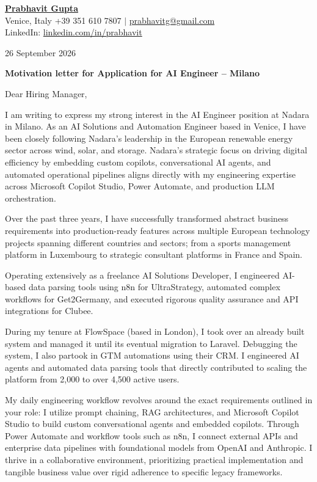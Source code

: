 \documentclass[a4paper,10pt]{article}
\begin{document}
\textbf{\underline{\large Prabhavit Gupta}}\\[2pt]
{\small Venice, Italy \quad +39 351 610 7807 \quad $\vert$ \quad \href{mailto:prabhavitg@gmail.com}{prabhavitg@gmail.com}\\[1pt]
LinkedIn: \href{https://www.linkedin.com/in/prabhavit/}{linkedin.com/in/prabhavit}}

\vspace{6pt}
26 September 2026

\vspace{4pt}
\textbf{\large Motivation letter for Application for AI Engineer -- Milano}

\vspace{4pt}
Dear Hiring Manager,

I am writing to express my strong interest in the AI Engineer position at Nadara in Milano. As an AI Solutions and Automation Engineer based in Venice, I have been closely following Nadara's leadership in the European renewable energy sector across wind, solar, and storage. Nadara's strategic focus on driving digital efficiency by embedding custom copilots, conversational AI agents, and automated operational pipelines aligns directly with my engineering expertise across Microsoft Copilot Studio, Power Automate, and production LLM orchestration.

Over the past three years, I have successfully transformed abstract business requirements into production-ready features across multiple European technology projects spanning different countries and sectors; from a sports management platform in Luxembourg to strategic consultant platforms in France and Spain.

Operating extensively as a freelance AI Solutions Developer, I engineered AI-based data parsing tools using n8n for UltraStrategy, automated complex workflows for Get2Germany, and executed rigorous quality assurance and API integrations for Clubee.

During my tenure at FlowSpace (based in London), I took over an already built system and managed it until its eventual migration to Laravel. Debugging the system, I also partook in GTM automations using their CRM. I engineered AI agents and automated data parsing tools that directly contributed to scaling the platform from 2,000 to over 4,500 active users.

My daily engineering workflow revolves around the exact requirements outlined in your role: I utilize prompt chaining, RAG architectures, and Microsoft Copilot Studio to build custom conversational agents and embedded copilots. Through Power Automate and workflow tools such as n8n, I connect external APIs and enterprise data pipelines with foundational models from OpenAI and Anthropic. I thrive in a collaborative environment, prioritizing practical implementation and tangible business value over rigid adherence to specific legacy frameworks.
\end{document}
